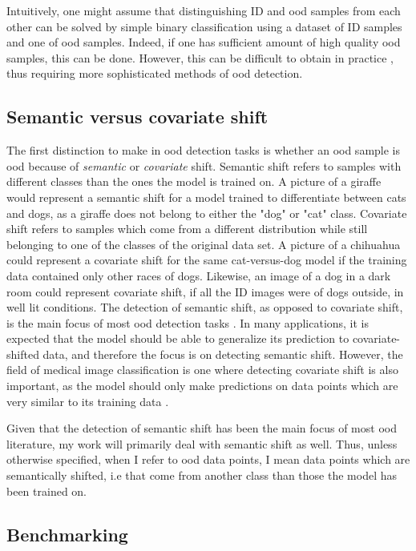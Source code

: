 \documentclass[UKenglish]{uiomasterthesis} %
\theoremstyle{definition}
\begin{document}
Intuitively, one might assume that distinguishing ID and \ac{ood} samples from each other can be solved by simple binary classification using a dataset of ID samples and one of \ac{ood} samples. Indeed, if one has sufficient amount of high quality \ac{ood} samples, this can be done. However, this can be difficult to obtain in practice \cite[15]{oodoverview}, thus requiring more sophisticated methods of \ac{ood} detection.

\subsection{Semantic versus covariate shift}

The first distinction to make in \ac{ood} detection tasks is whether an \ac{ood} sample is \ac{ood} because of {\it semantic} or {\it covariate} shift. Semantic shift refers to samples with different classes than the ones the model is trained on. A picture of a giraffe would represent a semantic shift for a model trained to differentiate between cats and dogs, as a giraffe does not belong to either the "dog" or "cat" class. Covariate shift refers to samples which come from a different distribution while still belonging to one of the classes of the original data set. A picture of a chihuahua could represent a covariate shift for the same cat-versus-dog model if the training data contained only other races of dogs. Likewise, an image of a dog in a dark room could represent covariate shift, if all the ID images were of dogs outside, in well lit conditions. The detection of semantic shift, as opposed to covariate shift, is the main focus of most \ac{ood} detection tasks \cite{oodoverview}. In many applications, it is expected that the model should be able to generalize its prediction to covariate-shifted data, and therefore the focus is on detecting semantic shift. However, the field of medical image classification is one where detecting covariate shift is also important, as the model should only make predictions on data points which are very similar to its training data \cite{oodoverview}.

Given that the detection of semantic shift has been the main focus of most \ac{ood} literature, my work will primarily deal with semantic shift as well. Thus, unless otherwise specified, when I refer to \ac{ood} data points, I mean data points which are semantically shifted, i.e that come from another class than those the model has been trained on.

\subsection{Benchmarking}
\end{document}
